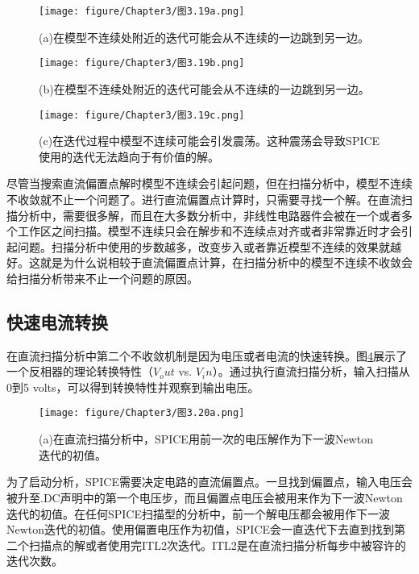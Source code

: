 \begin{figure}[htbp]
\small
    \centering
    \texttt{[image: figure/Chapter3/图3.19a.png]}
    \caption{(a)在模型不连续处附近的迭代可能会从不连续的一边跳到另一边。}
    \label{图3.19a}
\end{figure}

\begin{figure}[htbp]
\small
    \centering
    \texttt{[image: figure/Chapter3/图3.19b.png]}
    \caption{(b)在模型不连续处附近的迭代可能会从不连续的一边跳到另一边。}
    \label{图3.19b}
\end{figure}

\begin{figure}[htbp]
\small
    \centering
    \texttt{[image: figure/Chapter3/图3.19c.png]}
    \caption{(c)在迭代过程中模型不连续可能会引发震荡。这种震荡会导致SPICE使用的迭代无法趋向于有价值的解。}
    \label{图3.19c}
\end{figure}

尽管当搜索直流偏置点解时模型不连续会引起问题，但在扫描分析中，模型不连续不收敛就不止一个问题了。进行直流偏置点计算时，只需要寻找一个解。在直流扫描分析中，需要很多解，而且在大多数分析中，非线性电路器件会被在一个或者多个工作区之间扫描。模型不连续只会在解步和不连续点对齐或者非常靠近时才会引起问题。扫描分析中使用的步数越多，改变步入或者靠近模型不连续的效果就越好。这就是为什么说相较于直流偏置点计算，在扫描分析中的模型不连续不收敛会给扫描分析带来不止一个问题的原因。

\subsection{快速电流转换}
在直流扫描分析中第二个不收敛机制是因为电压或者电流的快速转换。图\ref{图3.20a}展示了一个反相器的理论转换特性（$V_out$ vs. $V_in$）。通过执行直流扫描分析，输入扫描从0到5 volts，可以得到转换特性并观察到输出电压。
\begin{figure}[htbp]
\small
    \centering
    \texttt{[image: figure/Chapter3/图3.20a.png]}
    \caption{(a)在直流扫描分析中，SPICE用前一次的电压解作为下一波Newton迭代的初值。}
    \label{图3.20a}
\end{figure}

为了启动分析，SPICE需要决定电路的直流偏置点。一旦找到偏置点，输入电压会被升至.DC声明中的第一个电压步，而且偏置点电压会被用来作为下一波Newton迭代的初值。在任何SPICE扫描型的分析中，前一个解电压都会被用作下一波Newton迭代的初值。使用偏置电压作为初值，SPICE会一直迭代下去直到找到第二个扫描点的解或者使用完ITL2次迭代。ITL2是在直流扫描分析每步中被容许的迭代次数。


